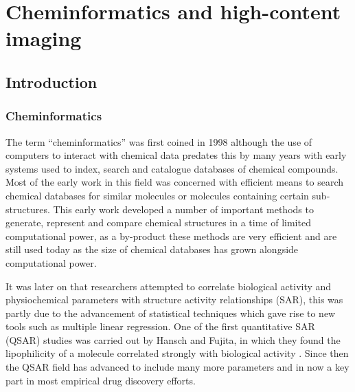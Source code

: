 \documentclass[a4paper,11pt,twoside,openright]{scrbook}
\begin{document}
\chapter{Cheminformatics and high-content imaging} \label{chapter:cheminformatics}

\section{Introduction}

\subsection{Cheminformatics}
The term ``cheminformatics'' was first coined in 1998\cite{Brown1998} although the use of computers to interact with chemical data predates this by many years with early systems used to index, search and catalogue databases of chemical compounds. \cite{Ray1957}
Most of the early work in this field was concerned with efficient means to search chemical databases for similar molecules or molecules containing certain sub-structures.
This early work developed a number of important methods to generate, represent and compare chemical structures in a time of limited computational power, as a by-product these methods are very efficient and are still used today as the size of chemical databases has grown alongside computational power.

It was later on that researchers attempted to correlate biological activity and physiochemical parameters with structure activity relationships (SAR), this was partly due to the advancement of statistical techniques which gave rise to new tools such as multiple linear regression.
One of the first quantitative SAR (QSAR) studies was carried out by Hansch and Fujita, in which they found the lipophilicity of a molecule correlated strongly with biological activity \cite{Hansch1962}.
Since then the QSAR field has advanced to include many more parameters and in now a key part in most empirical drug discovery efforts.
\end{document}
